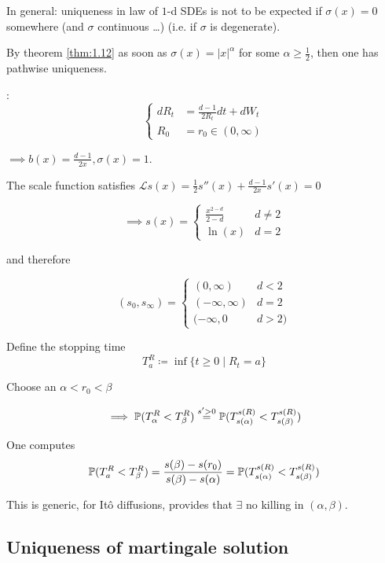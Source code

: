 \begin{remark}
    In general: uniqueness in law of $1$-d SDEs is not to be expected if 
    $\sigma(x)=0$ somewhere (and $\sigma$ continuous \dots) (i.e. if $\sigma$ is degenerate). 
\end{remark}

By theorem \ref{thm:1.12} as soon as $\sigma(x)=|x|^\alpha$ for some $\alpha\geq \frac{1}{2}$,
then one has pathwise uniqueness.

: 
\[\begin{cases}
    dR_t&=\frac{d-1}{2R_t}dt+dW_t\\
    R_0 &=r_0\in (0,\infty)\end{cases}\] 
    
$\implies b(x)=\frac{d-1}{2x},\sigma(x)=1$. 

The scale function satisfies $\mathcal{L}s(x)=\frac{1}{2}s''(x)+\frac{d-1}{2x}s'(x)=0$

\[\implies s(x)=\begin{cases}
    \frac{x^{2-d}}{2-d} & d\neq 2\\
    \ln(x) & d=2
\end{cases}\]

and therefore 

\[(s_0,s_\infty)=\begin{cases}
    (0,\infty) & d<2\\
    (-\infty,\infty) & d=2\\
    (-\infty,0 & d>2)
\end{cases}\]

Define the stopping time
\[T_a^R\coloneqq \inf\{t\geq 0\mid R_t=a\}\]

Choose an $\alpha<r_0<\beta$

\[\implies \mathbb{P}(T_\alpha^R<T_\beta^R)\stackrel{s'>0}{=}\mathbb{P}(T_{s(\alpha)}^{s(R)}<T_{s(\beta)}^{s(R)})\]

One computes
\begin{align*}
    \mathbb{P}(T_a^{R}<T_\beta^R)=\frac{s(\beta)-s(r_0)}{s(\beta)-s(\alpha)}=\mathbb{P}(T_{s(\alpha)}^{s(R)}<T_{s(\beta)}^{s(R)})
\end{align*}

This is generic, for Itô diffusions, provides that $\exists$ no killing in $(\alpha,\beta)$.


\subsection{Uniqueness of martingale solution}

